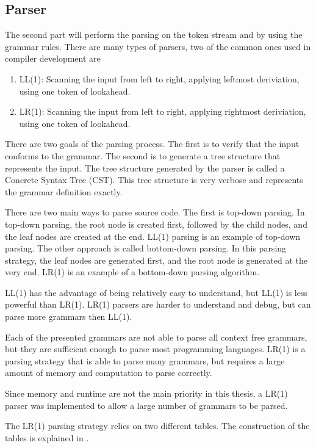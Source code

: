 
\subsection{Parser}

The second part will perform the parsing on the token stream and by using the grammar rules. 
There are many types of parsers, two of the common ones used in compiler development are

\begin{enumerate}
\item LL(1): Scanning the input from left to right, applying leftmost deriviation, using one token of lookahead.
\item LR(1): Scanning the input from left to right, applying rightmost deriviation, using one token of lookahead.
\end{enumerate}

There are two goals of the parsing process. 
The first is to verify that the input conforms to the grammar. 
The second is to generate a tree structure that represents the input. 
The tree structure generated by the parser is called a Concrete Syntax Tree (CST). 
This tree structure is very verbose and represents the grammar definition exactly.

There are two main ways to parse source code. 
The first is top-down parsing. 
In top-down parsing, the root node is created first, followed by the child nodes, and the leaf nodes are created at the end. 
LL(1) parsing is an example of top-down parsing. 
The other approach is called bottom-down parsing. 
In this parsing strategy, the leaf nodes are generated first, and the root node is generated at the very end. 
LR(1) is an example of a bottom-down parsing algorithm.

LL(1) has the advantage of being relatively easy to understand, but LL(1) is less powerful than LR(1). 
LR(1) parsers are harder to understand and debug, but can parse more grammars then LL(1).

Each of the presented grammars are not able to parse all context free grammars, but they are sufficient enough to parse most programming languages. 
LR(1) is a parsing strategy that is able to parse many grammars, but requires a large amount of memory and computation to parse correctly.

Since memory and runtime are not the main priority in this thesis, a LR(1) parser was implemented to allow a large number of grammars to be parsed.


The LR(1) parsing strategy relies on two different tables. The construction of the tables is explained in \cite{AhoLSU2006}.

